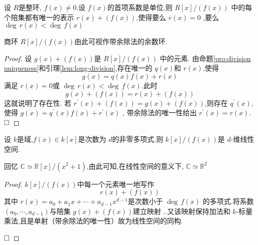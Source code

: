 \documentclass[lang=cn,12pt,color=green,fontset=none,pad]{elegantbook}
\begin{document}
\begin{corollary}
    设 $ R $是整环, $ f\left( x \right)\neq 0  $.设 $ f\left( x \right)  $的首项系数是单位.则 $ R[x]/\left( f\left( x \right)  \right)  $    中的每个陪集都有唯一的表示 $ r\left( x \right)+ \left( f\left( x \right)  \right)   $,使得要么 $ r\left( x \right)=0  $  ,要么 $ \operatorname{deg}\,r\left( x \right)< \operatorname{deg}\,f\left( x \right)   $ 
\end{corollary}
\begin{note}
    商环 $ R[x]/\left( f\left( x \right)  \right)  $由此可视作带余除法的余数环.
\end{note}
\begin{proof}
    设 $ g\left( x \right)+ \left( f\left( x \right)  \right)   $是 $ R[x]/\left( f\left( x \right)  \right)  $  中的元素.
    由命题\ref{pro:division uniqueness}和引理\ref{lem:long-division},存在唯一的 $ q\left( x \right)  $和 $ r\left( x \right)  $,使得 $$
    g\left( x \right)= q\left( x \right)f\left( x \right)+ r\left( x \right)    
    $$满足 $ r\left( x \right)=0  $或 $ \operatorname{deg}\,r\left( x \right)  < \operatorname{deg}\,f\left( x \right) $.此时 $$
    g\left( x \right)+ \left( f\left( x \right)  \right)=r\left( x \right)+ \left( f\left( x \right)  \right)    
    $$   这就说明了存在性. 若 $ r^{\prime} \left( x \right)+ \left( f\left( x \right)  \right)= g\left( x \right)+ \left( f\left( x \right)  \right)     $,则存在 $ q^{\prime} \left( x \right)  $,使得 $ g\left( x \right)  = q^{\prime} \left( x \right)f\left( x \right)+ r^{\prime} \left( x \right)   $   , 带余除法的唯一性给出 $ r^{\prime} \left( x \right)=r\left( x \right)   $. 
    $\hfill\square$
\end{proof}

\begin{theorem}\label{thm:mod-f-to-be-vector-space}
    设 $ k $是域,$ f\left( x \right)\in k[x]  $是次数为 $ d $的非零多项式.则 $ k[x]/\left( f\left( x \right)  \right)  $是 $ d $-维线性空间.
\end{theorem}
\begin{remark}
    回忆 $ \mathbb{C}\simeq  \mathbb{R} [x]/\left( x^{2}+ 1 \right)  $,由此可知,在线性空间的意义下, $ \mathbb{C}\simeq  \mathbb{R} ^{2} $  
\end{remark}
\begin{proof}
    $ k[x]/\left( f\left( x \right)  \right)  $中每一个元素唯一地写作 $$
    r\left( x \right)+ \left( f\left( x \right)  \right)  
    $$其中 $ r\left( x \right)=a_0+ a_1x+ \cdots + a_{d-1}x^{d-1}  $是次数小于 $ \operatorname{deg}\,f\left( x \right)  $   的多项式.将系数 $ \left( a_0,\cdots ,a_{d-1} \right)  $与陪集 $ g\left( x \right)+ \left( f\left( x \right)  \right)   $建立映射 ..又该映射保持加法和 $ k $-标量乘法,且是单射（带余除法的唯一性）故为线性空间的同构.  

    $\hfill\square$
\end{proof}
\end{document}
